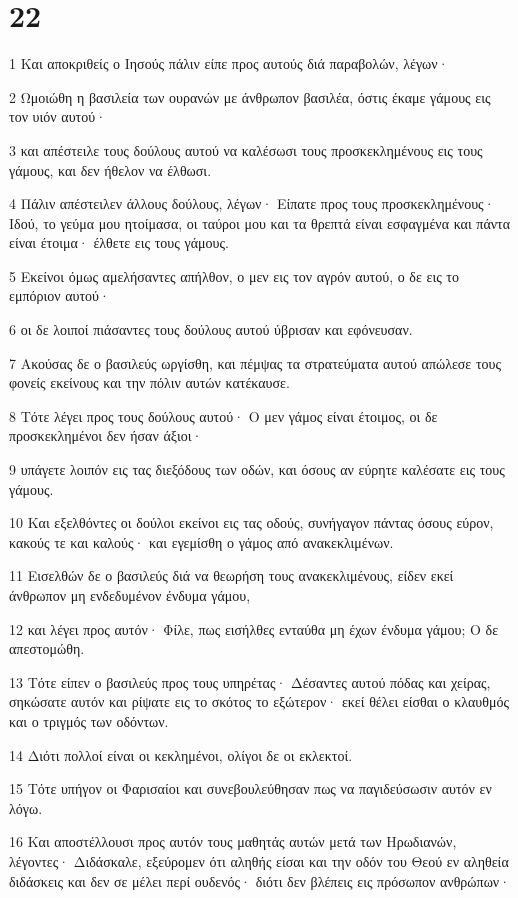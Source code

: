 \chapter{22}

\par 1 Και αποκριθείς ο Ιησούς πάλιν είπε προς αυτούς διά παραβολών, λέγων·
\par 2 Ωμοιώθη η βασιλεία των ουρανών με άνθρωπον βασιλέα, όστις έκαμε γάμους εις τον υιόν αυτού·
\par 3 και απέστειλε τους δούλους αυτού να καλέσωσι τους προσκεκλημένους εις τους γάμους, και δεν ήθελον να έλθωσι.
\par 4 Πάλιν απέστειλεν άλλους δούλους, λέγων· Είπατε προς τους προσκεκλημένους· Ιδού, το γεύμα μου ητοίμασα, οι ταύροι μου και τα θρεπτά είναι εσφαγμένα και πάντα είναι έτοιμα· έλθετε εις τους γάμους.
\par 5 Εκείνοι όμως αμελήσαντες απήλθον, ο μεν εις τον αγρόν αυτού, ο δε εις το εμπόριον αυτού·
\par 6 οι δε λοιποί πιάσαντες τους δούλους αυτού ύβρισαν και εφόνευσαν.
\par 7 Ακούσας δε ο βασιλεύς ωργίσθη, και πέμψας τα στρατεύματα αυτού απώλεσε τους φονείς εκείνους και την πόλιν αυτών κατέκαυσε.
\par 8 Τότε λέγει προς τους δούλους αυτού· Ο μεν γάμος είναι έτοιμος, οι δε προσκεκλημένοι δεν ήσαν άξιοι·
\par 9 υπάγετε λοιπόν εις τας διεξόδους των οδών, και όσους αν εύρητε καλέσατε εις τους γάμους.
\par 10 Και εξελθόντες οι δούλοι εκείνοι εις τας οδούς, συνήγαγον πάντας όσους εύρον, κακούς τε και καλούς· και εγεμίσθη ο γάμος από ανακεκλιμένων.
\par 11 Εισελθών δε ο βασιλεύς διά να θεωρήση τους ανακεκλιμένους, είδεν εκεί άνθρωπον μη ενδεδυμένον ένδυμα γάμου,
\par 12 και λέγει προς αυτόν· Φίλε, πως εισήλθες ενταύθα μη έχων ένδυμα γάμου; Ο δε απεστομώθη.
\par 13 Τότε είπεν ο βασιλεύς προς τους υπηρέτας· Δέσαντες αυτού πόδας και χείρας, σηκώσατε αυτόν και ρίψατε εις το σκότος το εξώτερον· εκεί θέλει είσθαι ο κλαυθμός και ο τριγμός των οδόντων.
\par 14 Διότι πολλοί είναι οι κεκλημένοι, ολίγοι δε οι εκλεκτοί.
\par 15 Τότε υπήγον οι Φαρισαίοι και συνεβουλεύθησαν πως να παγιδεύσωσιν αυτόν εν λόγω.
\par 16 Και αποστέλλουσι προς αυτόν τους μαθητάς αυτών μετά των Ηρωδιανών, λέγοντες· Διδάσκαλε, εξεύρομεν ότι αληθής είσαι και την οδόν του Θεού εν αληθεία διδάσκεις και δεν σε μέλει περί ουδενός· διότι δεν βλέπεις εις πρόσωπον ανθρώπων·
